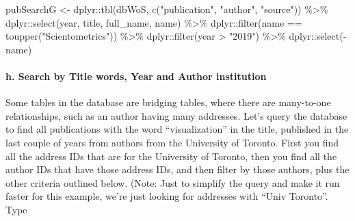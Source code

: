 \documentclass[
]{article}
\newenvironment{Shaded}{\begin{snugshade}}{\end{snugshade}}
\newcommand{\FunctionTok}[1]{\textcolor[rgb]{0.00,0.00,0.00}{#1}}
\newcommand{\NormalTok}[1]{#1}
\newcommand{\OtherTok}[1]{\textcolor[rgb]{0.56,0.35,0.01}{#1}}
\newcommand{\SpecialCharTok}[1]{\textcolor[rgb]{0.00,0.00,0.00}{#1}}
\newcommand{\StringTok}[1]{\textcolor[rgb]{0.31,0.60,0.02}{#1}}
\begin{document}
\begin{Shaded}
\begin{Highlighting}[]
\NormalTok{pubSearchG }\OtherTok{\textless{}{-}}\NormalTok{ dplyr}\SpecialCharTok{::}\FunctionTok{tbl}\NormalTok{(dbWoS, }\FunctionTok{c}\NormalTok{(}\StringTok{"publication"}\NormalTok{, }\StringTok{"author"}\NormalTok{, }\StringTok{"source"}\NormalTok{)) }\SpecialCharTok{\%\textgreater{}\%}
\NormalTok{  dplyr}\SpecialCharTok{::}\FunctionTok{select}\NormalTok{(year, title, full\_name, name) }\SpecialCharTok{\%\textgreater{}\%}
\NormalTok{  dplyr}\SpecialCharTok{::}\FunctionTok{filter}\NormalTok{(name }\SpecialCharTok{==} \FunctionTok{toupper}\NormalTok{(}\StringTok{"Scientometrics"}\NormalTok{)) }\SpecialCharTok{\%\textgreater{}\%}
\NormalTok{  dplyr}\SpecialCharTok{::}\FunctionTok{filter}\NormalTok{(year }\SpecialCharTok{\textgreater{}} \StringTok{"2019"}\NormalTok{) }\SpecialCharTok{\%\textgreater{}\%}
\NormalTok{  dplyr}\SpecialCharTok{::}\FunctionTok{select}\NormalTok{(}\SpecialCharTok{{-}}\NormalTok{name)}
\end{Highlighting}
\end{Shaded}

\hypertarget{h.-search-by-title-words-year-and-author-institution}{%
\paragraph{h. Search by Title words, Year and Author
institution}\label{h.-search-by-title-words-year-and-author-institution}}

Some tables in the database are bridging tables, where there are
many-to-one relationships, such as an author having many addresses.
Let's query the database to find all publications with the word
``visualization'' in the title, published in the last couple of years
from authors from the University of Toronto. First you find all the
address IDs that are for the University of Toronto, then you find all
the author IDs that have those address IDs, and then filter by those
authors, plus the other criteria outlined below. (Note: Just to simplify
the query and make it run faster for this example, we're just looking
for addresses with ``Univ Toronto''. Type
\end{document}
